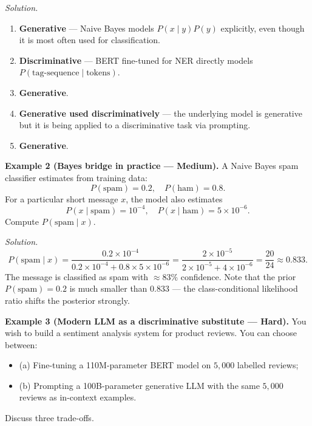 \textit{Solution.}
\begin{enumerate}
    \item \textbf{Generative} --- Naive Bayes models $P(x \mid y) P(y)$ explicitly, even though it is most often used for classification.
    \item \textbf{Discriminative} --- BERT fine-tuned for NER directly models $P(\text{tag-sequence} \mid \text{tokens})$.
    \item \textbf{Generative}.
    \item \textbf{Generative used discriminatively} --- the underlying model is generative but it is being applied to a discriminative task via prompting.
    \item \textbf{Generative}.
\end{enumerate}

\medskip

\textbf{Example 2 (Bayes bridge in practice --- Medium).}
A Naive Bayes spam classifier estimates from training data:
\[ P(\text{spam}) = 0.2, \quad P(\text{ham}) = 0.8. \]
For a particular short message $x$, the model also estimates
\[ P(x \mid \text{spam}) = 10^{-4}, \quad P(x \mid \text{ham}) = 5 \times 10^{-6}. \]
Compute $P(\text{spam} \mid x)$.

\textit{Solution.}
\[ P(\text{spam} \mid x) = \frac{0.2 \times 10^{-4}}{0.2 \times 10^{-4} + 0.8 \times 5 \times 10^{-6}} = \frac{2 \times 10^{-5}}{2 \times 10^{-5} + 4 \times 10^{-6}} = \frac{20}{24} \approx 0.833. \]
The message is classified as spam with $\approx 83\%$ confidence. Note that the prior $P(\text{spam}) = 0.2$ is much smaller than $0.833$ --- the class-conditional likelihood ratio shifts the posterior strongly.

\medskip

\textbf{Example 3 (Modern LLM as a discriminative substitute --- Hard).}
You wish to build a sentiment analysis system for product reviews. You can choose between:
\begin{itemize}
    \item (a) Fine-tuning a 110M-parameter BERT model on $5{,}000$ labelled reviews;
    \item (b) Prompting a 100B-parameter generative LLM with the same $5{,}000$ reviews as in-context examples.
\end{itemize}
Discuss three trade-offs.

